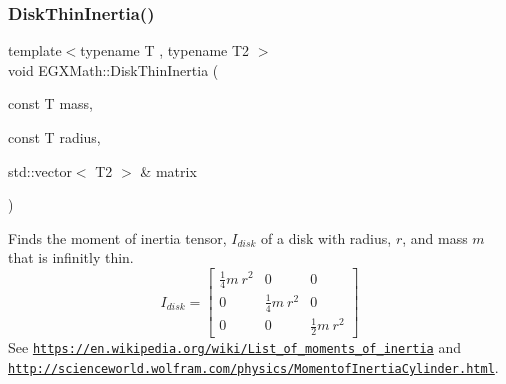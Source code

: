 \subsubsection{\texorpdfstring{Disk\+Thin\+Inertia()}{DiskThinInertia()}\hspace{0.1cm}{\footnotesize\ttfamily [2/3]}}
{\footnotesize\ttfamily template$<$typename T , typename T2 $>$ \\
void E\+G\+X\+Math\+::\+Disk\+Thin\+Inertia (\begin{DoxyParamCaption}\item[{const T}]{mass,  }\item[{const T}]{radius,  }\item[{std\+::vector$<$ T2 $>$ \&}]{matrix }\end{DoxyParamCaption})}



Finds the moment of inertia tensor, $I_{disk}$ of a disk with radius, $r$, and mass $m$ that is infinitly thin. \[ I_{disk}=\begin{bmatrix} \frac{1}{4}m\ r^2 & 0 & 0\\ 0 & \frac{1}{4}m\ r^2 & 0\\ 0 & 0 & \frac{1}{2}m\ r^2 \end{bmatrix} \] See \href{https://en.wikipedia.org/wiki/List_of_moments_of_inertia}{\tt https\+://en.\+wikipedia.\+org/wiki/\+List\+\_\+of\+\_\+moments\+\_\+of\+\_\+inertia} and \href{http://scienceworld.wolfram.com/physics/MomentofInertiaCylinder.html}{\tt http\+://scienceworld.\+wolfram.\+com/physics/\+Momentof\+Inertia\+Cylinder.\+html}. 


